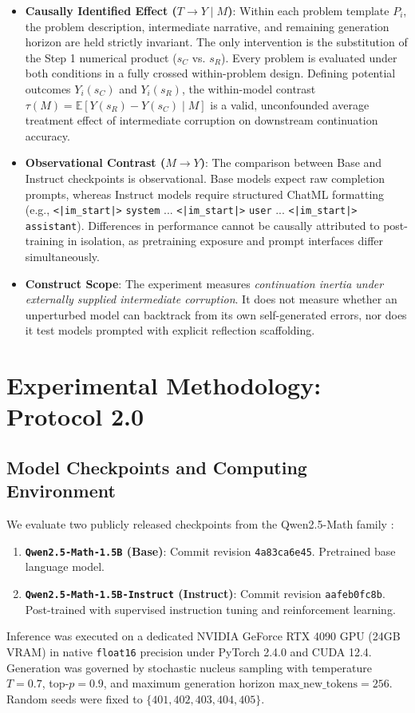 \documentclass[11pt,letterpaper]{article}
\newcommand{\modelbase}{\texttt{Qwen2.5-Math-1.5B}}
\newcommand{\modelinstruct}{\texttt{Qwen2.5-Math-1.5B-Instruct}}
\begin{document}
\begin{itemize}[leftmargin=*]
    \item \textbf{Causally Identified Effect ($T \to Y \mid M$)}: Within each problem template $P_i$, the problem description, intermediate narrative, and remaining generation horizon are held strictly invariant. The only intervention is the substitution of the Step 1 numerical product ($s_C$ vs. $s_R$). Every problem is evaluated under both conditions in a fully crossed within-problem design. Defining potential outcomes $Y_i(s_C)$ and $Y_i(s_R)$, the within-model contrast $\tau(M) = \mathbb{E}[Y(s_R) - Y(s_C) \mid M]$ is a valid, unconfounded average treatment effect of intermediate corruption on downstream continuation accuracy.
    \item \textbf{Observational Contrast ($M \to Y$)}: The comparison between Base and Instruct checkpoints is observational. Base models expect raw completion prompts, whereas Instruct models require structured ChatML formatting (e.g., \texttt{<|im\_start|>} \texttt{system} ... \texttt{<|im\_start|>} \texttt{user} ... \texttt{<|im\_start|>} \texttt{assistant}). Differences in performance cannot be causally attributed to post-training in isolation, as pretraining exposure and prompt interfaces differ simultaneously.
    \item \textbf{Construct Scope}: The experiment measures \textit{continuation inertia under externally supplied intermediate corruption}. It does not measure whether an unperturbed model can backtrack from its own self-generated errors, nor does it test models prompted with explicit reflection scaffolding.
\end{itemize}

\section{Experimental Methodology: Protocol 2.0}

\subsection{Model Checkpoints and Computing Environment}
We evaluate two publicly released checkpoints from the Qwen2.5-Math family \cite{qwen25math2024}:
\begin{enumerate}
    \item \textbf{\modelbase{} (Base)}: Commit revision \texttt{4a83ca6e45}. Pretrained base language model.
    \item \textbf{\modelinstruct{} (Instruct)}: Commit revision \texttt{aafeb0fc8b}. Post-trained with supervised instruction tuning and reinforcement learning.
\end{enumerate}
Inference was executed on a dedicated NVIDIA GeForce RTX 4090 GPU (24GB VRAM) in native \texttt{float16} precision under PyTorch 2.4.0 and CUDA 12.4. Generation was governed by stochastic nucleus sampling with temperature $T=0.7$, top-$p=0.9$, and maximum generation horizon $\text{max\_new\_tokens}=256$. Random seeds were fixed to $\{401, 402, 403, 404, 405\}$.
\end{document}
